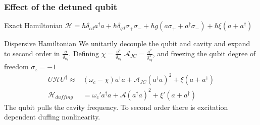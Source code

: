 \documentclass[xetex]{beamer}
\begin{document}
\begin{frame}
    \frametitle{Effect of the detuned qubit}
    \begin{block}{Exact Hamiltonian}
        $
        \mathscr{H} = \hbar \delta_{cd} a^\dagger a + 
        \hbar \delta_{qd}\sigma_+ \sigma_- + 
        \hbar g ( a \sigma_+ + a^\dagger \sigma_- ) 
        +\hbar \xi (a+a^\dagger)
        $
    \end{block}
    \begin{block}{Dispersive Hamiltonian}
    We unitarily decouple the qubit and cavity 
    and expand to second order in $\frac{g}{\delta_{cq}}$. Defining 
    $\chi = \frac{g^2}{\delta_{cq}}$
    $\mathscr{A}_{JC} = \frac{g^2}{\delta_{cq}^3}$, 
    and freezing the qubit degree of freedom 
    $\sigma_z = -1$
    \begin{align}
    U\mathscr{H}U ^ \dagger \approx& 
         \left(\omega_c - \chi\right) a ^ \dagger a
        + \mathscr{A}_{JC}\left(a^\dagger a\right)^2
        + \xi ( a + a^\dagger ) \\
    \mathscr{H}_{duffing} &= \omega_c' a^\dagger a 
        + \mathscr{A} \left(a^\dagger a\right)^2 
        + \xi'\left(a+a^\dagger\right)
    \end{align} 
    The qubit pulls the cavity frequency. 
    To second order there is excitation dependent 
    duffing nonlinearity.
    \end{block}
\end{frame}
\end{document}
